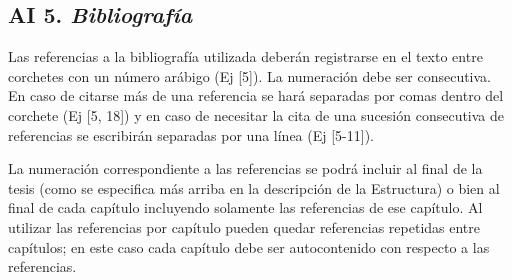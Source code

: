 \subsection*{AI 5. \textit{Bibliografía}}
Las referencias a la bibliografía utilizada deberán registrarse en el texto entre corchetes con un número arábigo (Ej [5]). La numeración debe ser consecutiva. En caso de citarse más de una referencia se hará separadas por comas dentro del corchete (Ej [5, 18]) y en caso de necesitar la cita de una sucesión consecutiva de referencias se escribirán separadas por una línea (Ej [5-11]).

La numeración correspondiente a las referencias se podrá incluir al final de la tesis (como se especifica más arriba en la descripción de la Estructura) o bien al final de cada capítulo incluyendo solamente las referencias de ese capítulo. Al utilizar las referencias por capítulo pueden quedar referencias repetidas entre capítulos; en este caso cada capítulo debe ser autocontenido con respecto a las referencias.
